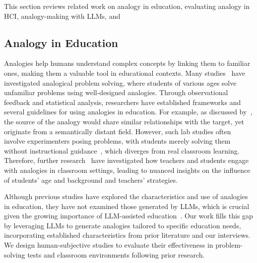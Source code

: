 This section reviews related work on analogy in education, evaluating analogy in HCI, analogy-making with LLMs, and  
\subsection{Analogy in Education}
Analogies help humans understand complex concepts by linking them to familiar ones, making them a valuable tool in educational contexts. 
Many studies~\cite{thagard_analogy_1992,gick_analogical_1980,gick_schema_1983, brown_analogical_1989} have investigated analogical problem solving, where students of various ages solve unfamiliar problems using well-designed analogies. 
Through observational feedback and statistical analysis, researchers have established frameworks and several guidelines for using analogies in education. 
For example, as discussed by~\cite{gick_analogical_1980}, the source of the analogy would share similar relationships with the target, yet originate from a semantically distant field. 
However, such lab studies often involve experimenters posing problems, with students merely solving them without instructional guidance~\cite{brown_analogical_1989}, which diverges from real classroom learning.
Therefore, further research~\cite{vendetti_analogical_2015,richland_analogy_2004,treagust_science_1992,oliva_teaching_2007} have investigated how teachers and students engage with analogies in classroom settings, leading to nuanced insights on the influence of students' age and background and teachers' strategies.

Although previous studies have explored the characteristics and use of analogies in education, they have not examined those generated by LLMs, which is crucial given the growing importance of LLM-assisted education~\cite{gao2024fine, Lyu2024evaluating}.
Our work fills this gap by leveraging LLMs to generate analogies tailored to specific education needs, incorporating established characteristics from prior literature and our interviews.
We design human-subjective studies to evaluate their effectiveness in problem-solving tests and classroom environments following prior research.

